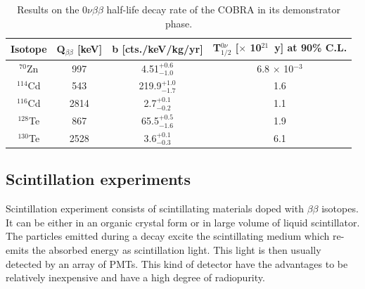 \documentclass[main.tex]{subfiles}
\begin{document}
\begin{table}[h!]
\centering
\begin{tabular}{c|c|c|c}
\toprule
Isotope & Q$_{\beta\beta}$ [keV] & b [cts./keV/kg/yr] & T$_{\text{1/2}}^{0\nu}$ [$\times$ 10$^{\text{21}}$~y] at 90\% C.L. \\[0.1cm]
\hline
$^{\text{70}}$Zn  & 997  & 4.51$^{+\text{0.6}}_{-\text{1.0}}$  & 6.8 $\times$ 10$^{-\text{3}}$ \\[0.1cm]
$^{\text{114}}$Cd & 543  & 219.9$^{+\text{1.0}}_{-\text{1.7}}$ & 1.6 \\[0.1cm]
$^{\text{116}}$Cd & 2814 & 2.7$^{+\text{0.1}}_{-\text{0.2}}$   & 1.1 \\[0.1cm]
$^{\text{128}}$Te & 867  & 65.5$^{+\text{0.5}}_{-\text{1.6}}$  & 1.9 \\[0.1cm]
$^{\text{130}}$Te & 2528 & 3.6$^{+\text{0.1}}_{-\text{0.3}}$   & 6.1 \\[0.1cm]
\bottomrule
\end{tabular}
\caption{Results on the 0$\nu\beta\beta$ half-life decay rate of the COBRA in its demonstrator phase.}
\label{tab:CobraResultsDemonstrator}
\end{table}



\subsection{Scintillation experiments}


\NI Scintillation experiment consists of scintillating materials doped with $\beta\beta$ isotopes. It can be either in an organic crystal form or in large volume of liquid scintillator. The particles emitted during a decay excite the scintillating medium which re-emits the absorbed energy as scintillation light. This light is then usually detected by an array of PMTs. This kind of detector have the advantages to be relatively inexpensive and have a high degree of radiopurity. 


\bigskip


\end{document}
